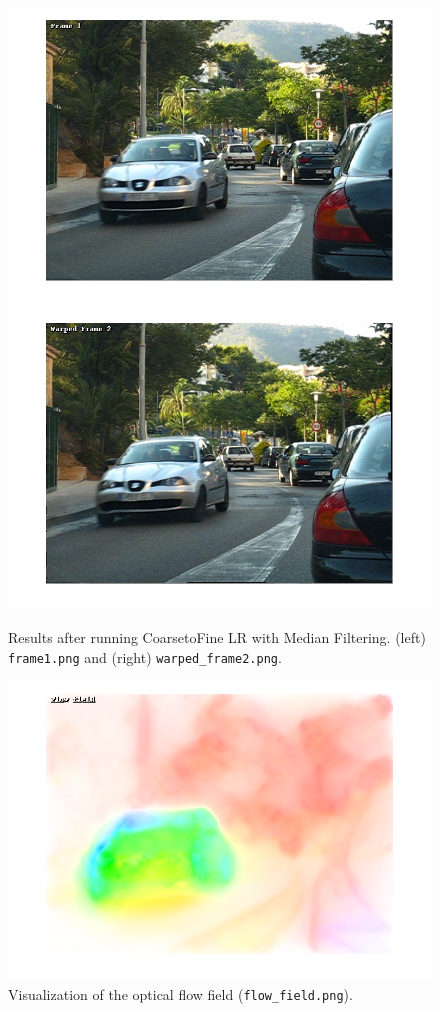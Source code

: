 \documentclass[12pt,twoside]{article}
\begin{document}
\begin{figure}[h]
  \begin{center}
    \includegraphics[width=0.4\linewidth, trim= 80pt 80pt 80pt 80pt, clip]{frame1.png}
    \includegraphics[width=0.4\linewidth, trim= 80pt 80pt 80pt 80pt, clip]{warped_frame2.png}

  \end{center}
  \caption{Results after running Coarse\-to\-Fine LR with Median Filtering. (left) \texttt{frame1.png} and (right) \texttt{warped\_frame2.png}.}
  \label{fig:pipeline}
\end{figure}

\begin{figure}[t]
  \begin{center}
    \includegraphics[width=0.6\linewidth, trim= 80pt 80pt 80pt 80pt, clip]{flow_field.png}

  \end{center}
  \caption{Visualization of the optical flow field (\texttt{flow\_field.png}).}
  \label{fig:pipeline}
\end{figure}
\end{document}
